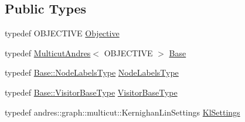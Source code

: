 \subsection*{Public Types}
\begin{DoxyCompactItemize}
\item 
typedef O\+B\+J\+E\+C\+T\+I\+V\+E \hyperlink{classnifty_1_1graph_1_1optimization_1_1multicut_1_1MulticutAndresKernighanLin_a97f5dee93f006373748000f85e918824}{Objective}
\item 
typedef \hyperlink{classnifty_1_1graph_1_1optimization_1_1multicut_1_1MulticutAndres}{Multicut\+Andres}$<$ O\+B\+J\+E\+C\+T\+I\+V\+E $>$ \hyperlink{classnifty_1_1graph_1_1optimization_1_1multicut_1_1MulticutAndresKernighanLin_ad3d54ded77e917607cbf101324298e36}{Base}
\item 
typedef \hyperlink{classnifty_1_1graph_1_1optimization_1_1multicut_1_1MulticutAndres_aebe9bae6ca2760f72e19ec62504de209}{Base\+::\+Node\+Labels\+Type} \hyperlink{classnifty_1_1graph_1_1optimization_1_1multicut_1_1MulticutAndresKernighanLin_a2c143d6b6e06a70388ba8a74d6b8d2ca}{Node\+Labels\+Type}
\item 
typedef \hyperlink{classnifty_1_1graph_1_1optimization_1_1multicut_1_1MulticutAndres_a2d78bb58be29b7d46e9c653489a6d1de}{Base\+::\+Visitor\+Base\+Type} \hyperlink{classnifty_1_1graph_1_1optimization_1_1multicut_1_1MulticutAndresKernighanLin_aa9ff2451667fafb8a65092737bf63610}{Visitor\+Base\+Type}
\item 
typedef andres\+::graph\+::multicut\+::\+Kernighan\+Lin\+Settings \hyperlink{classnifty_1_1graph_1_1optimization_1_1multicut_1_1MulticutAndresKernighanLin_ae78ffe96f141f7086d4efb20ff12ff55}{Kl\+Settings}
\end{DoxyCompactItemize}

